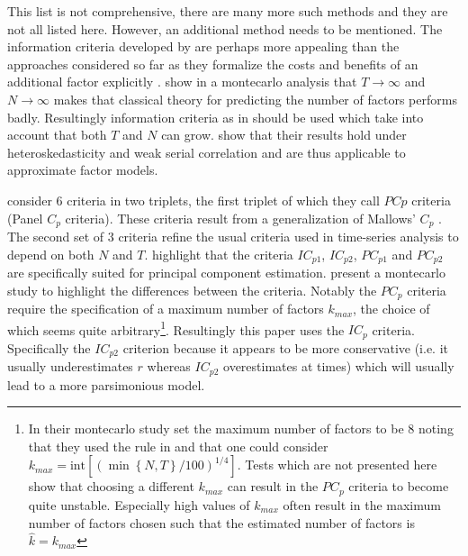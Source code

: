 \documentclass[12pt]{article}
\begin{document}
This list is not comprehensive, there are many more such methods and they are not all listed here. However, an additional method needs to be mentioned. The information criteria developed by \citet{bai2002determining} are perhaps more appealing than the approaches considered so far as they formalize the costs and benefits of an additional factor explicitly \citep{stock2011dynamic}. \citet{cragg1997inferring} show in a montecarlo analysis that $T\rightarrow\infty$ and $N\rightarrow\infty$ makes that classical theory for predicting the number of factors performs badly. Resultingly information criteria as in \citet{bai2002determining} should be used which take into account that both $T$ and $N$ can grow. \citet{bai2002determining} show that their results hold under heteroskedasticity and weak serial correlation and are thus applicable to approximate factor models.

\citet{bai2002determining} consider $6$ criteria in two triplets, the first triplet of which they call $PCp$ criteria (Panel $C_p$ criteria). These criteria result from a generalization of Mallows' $C_p$ \citep{mallows1973some}. The second set of $3$ criteria refine the usual criteria used in time-series analysis to depend on both $N$ and $T$. \citet{bai2002determining} highlight that the criteria $IC_{p1}$, $IC_{p2}$, $PC_{p1}$ and $PC_{p2}$ are specifically suited for principal component estimation. \citet{bai2002determining} present a montecarlo study to highlight the differences between the criteria. Notably the $PC_{p}$ criteria require the specification of a maximum number of factors $k_{max}$, the choice of which seems quite arbitrary\footnote{In their montecarlo study \citet{bai2002determining} set the maximum number of factors to be $8$ noting that they used the rule in \citet{schwert2002tests} and that one could consider $k_{max}=\text{int}[(\min\left\{N, T\right\}/100)^{1/4}]$. Tests which are not presented here show that choosing a different $k_{max}$ can result in the $PC_p$ criteria to become quite unstable. Especially high values of $k_{max}$ often result in the maximum number of factors chosen such that the estimated number of factors is $\hat k=k_{max}$}. Resultingly this paper uses the $IC_p$ criteria. Specifically the $IC_{p2}$ criterion because it appears to be more conservative (i.e. it usually underestimates $r$ whereas $IC_{p2}$ overestimates at times) which will usually lead to a more parsimonious model.
\end{document}
